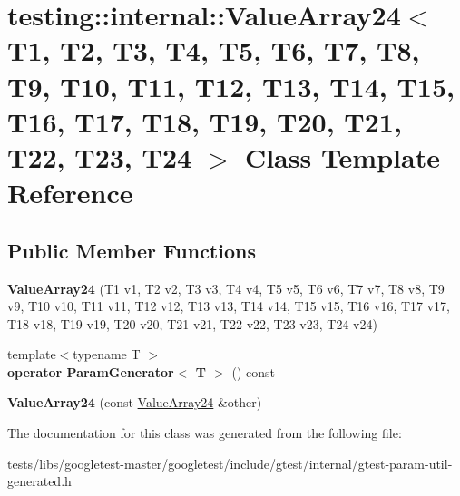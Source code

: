 \hypertarget{classtesting_1_1internal_1_1ValueArray24}{}\section{testing\+:\+:internal\+:\+:Value\+Array24$<$ T1, T2, T3, T4, T5, T6, T7, T8, T9, T10, T11, T12, T13, T14, T15, T16, T17, T18, T19, T20, T21, T22, T23, T24 $>$ Class Template Reference}
\label{classtesting_1_1internal_1_1ValueArray24}
\subsection*{Public Member Functions}
\begin{DoxyCompactItemize}
\item 
\mbox{\label{classtesting_1_1internal_1_1ValueArray24_abee2a51b2ed37f05ccecf7f2d5f43106}} 
{\bfseries Value\+Array24} (T1 v1, T2 v2, T3 v3, T4 v4, T5 v5, T6 v6, T7 v7, T8 v8, T9 v9, T10 v10, T11 v11, T12 v12, T13 v13, T14 v14, T15 v15, T16 v16, T17 v17, T18 v18, T19 v19, T20 v20, T21 v21, T22 v22, T23 v23, T24 v24)
\item 
\mbox{\label{classtesting_1_1internal_1_1ValueArray24_a6832c33cb80f6e0ff5fd0c557e743442}} 
{\footnotesize template$<$typename T $>$ }\\{\bfseries operator Param\+Generator$<$ T $>$} () const
\item 
\mbox{\label{classtesting_1_1internal_1_1ValueArray24_ae0e1f56f53518702e36b7b425c5513c6}} 
{\bfseries Value\+Array24} (const \hyperlink{classtesting_1_1internal_1_1ValueArray24}{Value\+Array24} \&other)
\end{DoxyCompactItemize}


The documentation for this class was generated from the following file\+:\begin{DoxyCompactItemize}
\item 
tests/libs/googletest-\/master/googletest/include/gtest/internal/gtest-\/param-\/util-\/generated.\+h\end{DoxyCompactItemize}
